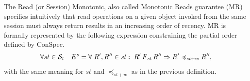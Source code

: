 \documentclass[acmlarge, ,11pt]{acmart}
\begin{document}
\par The Read (or Session) Monotonic, also called Monotonic Reads guarantee (MR) specifies intuitively that read operations on a given object invoked from the same session must always return results in an increasing order of recency.   MR is formally represented by the following expression constraining the partial order defined by ConSpec.
\begin{align}\label{eqn:MR}
\begin{split}
 \forall st \in \mathcal{S}_t \quad E^{s} = \forall \;  {R}', {R}'' \in \mathit{st} : \; {R}' \operatorname{\it F}_\mathit{st} {R}''
 \Rightarrow {R}' \preccurlyeq_{\mathit{st}+w} {R}'' ,
\end{split}
\end{align} with the same meaning for $\mathit{st}$ and $\preccurlyeq_{\mathit{st}+w}$ as in the previous definition.
\end{document}
